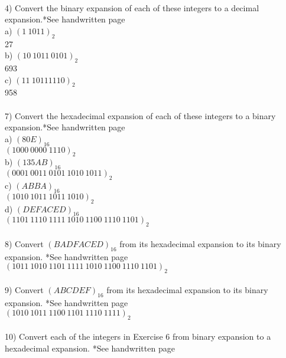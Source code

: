 \documentclass{article}
\begin{document}
\begin{flushleft}
~\\
\setlength\parindent{0pt}4) Convert the binary expansion of each of these integers to a decimal expansion.{\tiny **See handwritten page} \\
\setlength\parindent{24pt}a) $(1\:1011)_2$ \\
\setlength\parindent{48pt} 27 \\
\setlength\parindent{24pt}b) $(10\:1011\:0101)_2$ \\
\setlength\parindent{48pt} 693 \\
\setlength\parindent{24pt}c) $(11\:10111110)_2$ \\
\setlength\parindent{48pt} 958 \\
~\\
\setlength\parindent{0pt}7) Convert the hexadecimal expansion of each of these integers to a  binary expansion.{\tiny **See handwritten page} \\
\setlength\parindent{24pt}a) $(80E)_{16}$ \\
\setlength\parindent{48pt} $(1000\:0000\:1110)_2$ \\
\setlength\parindent{24pt}b) $(135AB)_{16}$ \\
\setlength\parindent{48pt} $(0001\:0011\:0101\:1010\:1011)_2$ \\
\setlength\parindent{24pt}c) $(ABBA)_{16}$ \\
\setlength\parindent{48pt} $(1010\:1011\:1011\:1010)_{2}$ \\
\setlength\parindent{24pt}d) $(DEFACED)_{16}$ \\
\setlength\parindent{48pt} $(1101\:1110\:1111\:1010\:1100\:1110\:1101)_2$\\
~\\
\setlength\parindent{0pt}8) Convert $(BADFACED)_{16}$ from its hexadecimal expansion to its binary expansion. {\tiny **See handwritten page}\\
\setlength\parindent{24pt} $(1011\:1010\:1101\:1111\:1010\:1100\:1110\:1101)_2$ \\
~\\
\setlength\parindent{0pt}9) Convert $(ABCDEF)_{16}$ from its hexadecimal expansion to its binary expansion. {\tiny **See handwritten page}\\
\setlength\parindent{24pt}$(1010\:1011\:1100\:1101\:1110\:1111)_2$ \\
~\\
\setlength\parindent{0pt}10) Convert each of the integers in Exercise 6 from binary expansion to a hexadecimal expansion. {\tiny **See handwritten page}\\

\end{flushleft}
\end{document}
